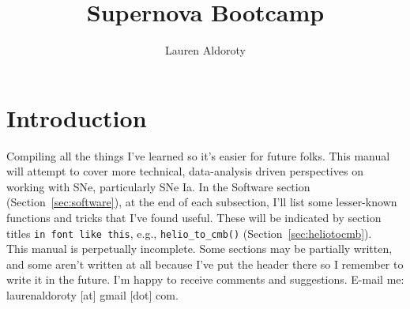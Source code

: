 \documentclass{ol-softwaremanual}
\title{Supernova Bootcamp}
\author{Lauren Aldoroty}
\begin{document}
\maketitle

\tableofcontents
\newpage

\section{Introduction}

Compiling all the things I've learned so it's easier for future folks. This manual will attempt to cover more technical, data-analysis driven perspectives on working with SNe, particularly SNe Ia. In the Software section (Section~\ref{sec:software}), at the end of each subsection, I'll list some lesser-known functions and tricks that I've found useful. These will be indicated by section titles \texttt{in font like this}, e.g., \texttt{helio\_to\_cmb()} (Section~\ref{sec:heliotocmb}).\\

This manual is perpetually incomplete. Some sections may be partially written, and some aren't written at all because I've put the header there so I remember to write it in the future. I'm happy to receive comments and suggestions. E-mail me: laurenaldoroty [at] gmail [dot] com. 












\end{document}
